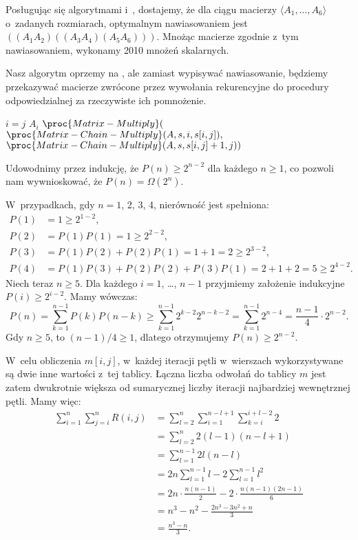 
\exercise %
Posługując się algorytmami  i~, dostajemy, że dla ciągu macierzy $\langle A_1,\dots,A_6\rangle$ o~zadanych rozmiarach, optymalnym nawiasowaniem jest $((A_1A_2)((A_3A_4)(A_5A_6)))$.
Mnożąc macierze zgodnie z~tym nawiasowaniem, wykonamy 2010 mnożeń skalarnych.

\exercise %
Nasz algorytm oprzemy na , ale zamiast wypisywać nawiasowanie, będziemy przekazywać macierze zwrócone przez wywołania rekurencyjne do procedury odpowiedzialnej za rzeczywiste ich pomnożenie.
\begin{codebox}
\li	\If $i=j$
\li		\Then \Return $A_i$
		\End
\li	\Return $\proc{Matrix-Multiply}($
\zi	\>\>\> $\proc{Matrix-Chain-Multiply}(A,s,i,s[i,j]),$
\zi	\>\>\> $\proc{Matrix-Chain-Multiply}(A,s,s[i,j]+1,j))$
\end{codebox}

\exercise %
Udowodnimy przez indukcję, że $P(n)\ge2^{n-2}$ dla każdego $n\ge1$, co pozwoli nam wywnioskować, że $P(n)=\Omega(2^n)$.

W~przypadkach, gdy $n=1$, 2, 3, 4, nierówność jest spełniona:
\begin{align*}
	P(1) &= 1 \ge 2^{1-2}, \\
	P(2) &= P(1)P(1) = 1 \ge 2^{2-2}, \\
	P(3) &= P(1)P(2)+P(2)P(1) = 1+1 = 2 \ge 2^{3-2}, \\
	P(4) &= P(1)P(3)+P(2)P(2)+P(3)P(1) = 2+1+2 = 5 \ge 2^{4-2}.
\end{align*}
Niech teraz $n\ge5$.
Dla każdego $i=1$, \dots, $n-1$ przyjmiemy założenie indukcyjne $P(i)\ge2^{i-2}$.
Mamy wówczas:
\[
	P(n) = \sum_{k=1}^{n-1}P(k)P(n-k) \ge \sum_{k=1}^{n-1}2^{k-2}2^{n-k-2} = \sum_{k=1}^{n-1}2^{n-4} = \frac{n-1}{4}\cdot2^{n-2}.
\]
Gdy $n\ge5$, to $(n-1)/4\ge1$, dlatego otrzymujemy $P(n)\ge2^{n-2}$.

\exercise %
W~celu obliczenia $m[i,j]$, w~każdej iteracji pętli  w~wierszach  wykorzystywane są dwie inne wartości z~tej tablicy.
Łączna liczba odwołań do tablicy $m$ jest zatem dwukrotnie większa od sumarycznej liczby iteracji najbardziej wewnętrznej pętli.
Mamy więc:
\begin{align*}
	\sum_{i=1}^n\sum_{j=i}^nR(i,j) &= \sum_{l=2}^n\sum_{i=1}^{n-l+1}\sum_{k=i}^{i+l-2}2 \\
	&= \sum_{l=2}^n2(l-1)(n-l+1) \\
	&= \sum_{l=1}^{n-1}2l(n-l) \\
	&= 2n\sum_{l=1}^{n-1}l-2\sum_{l=1}^{n-1}l^2 \\
	&= 2n\cdot\frac{n(n-1)}{2}-2\cdot\frac{n(n-1)(2n-1)}{6} \\
	&= n^3-n^2-\frac{2n^3-3n^2+n}{3} \\
	&= \frac{n^3-n}{3}.
\end{align*}

